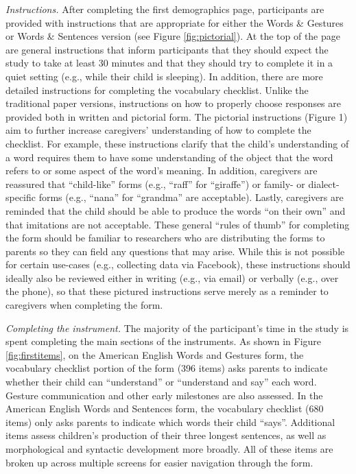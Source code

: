 \documentclass[
  english,
  ,man,floatsintext]{apa6}
\begin{document}
\emph{Instructions.} After completing the first demographics page, participants are provided with instructions that are appropriate for either the Words \& Gestures or Words \& Sentences version (see Figure \ref{fig:pictorial}). At the top of the page are general instructions that inform participants that they should expect the study to take at least 30 minutes and that they should try to complete it in a quiet setting (e.g., while their child is sleeping). In addition, there are more detailed instructions for completing the vocabulary checklist. Unlike the traditional paper versions, instructions on how to properly choose responses are provided both in written and pictorial form. The pictorial instructions (Figure 1) aim to further increase caregivers' understanding of how to complete the checklist. For example, these instructions clarify that the child's understanding of a word requires them to have some understanding of the object that the word refers to or some aspect of the word's meaning. In addition, caregivers are reassured that \enquote{child-like} forms (e.g., \enquote{raff} for \enquote{giraffe}) or family- or dialect-specific forms (e.g., \enquote{nana} for \enquote{grandma} are acceptable). Lastly, caregivers are reminded that the child should be able to produce the words \enquote{on their own} and that imitations are not acceptable. These general \enquote{rules of thumb} for completing the form should be familiar to researchers who are distributing the forms to parents so they can field any questions that may arise. While this is not possible for certain use-cases (e.g., collecting data via Facebook), these instructions should ideally also be reviewed either in writing (e.g., via email) or verbally (e.g., over the phone), so that these pictured instructions serve merely as a reminder to caregivers when completing the form.

\emph{Completing the instrument.} The majority of the participant's time in the study is spent completing the main sections of the instruments. As shown in Figure \ref{fig:firstitems}, on the American English Words and Gestures form, the vocabulary checklist portion of the form (396 items) asks parents to indicate whether their child can \enquote{understand} or \enquote{understand and say} each word. Gesture communication and other early milestones are also assessed. In the American English Words and Sentences form, the vocabulary checklist (680 items) only asks parents to indicate which words their child \enquote{says}. Additional items assess children's production of their three longest sentences, as well as morphological and syntactic development more broadly. All of these items are broken up across multiple screens for easier navigation through the form.
\end{document}

